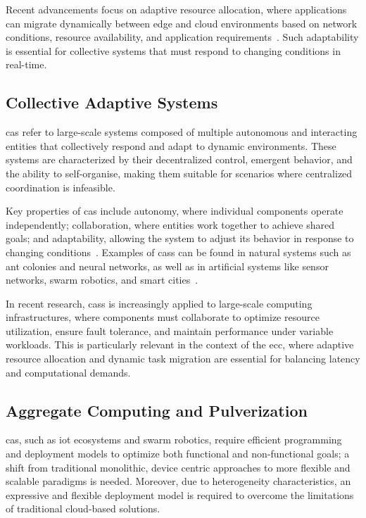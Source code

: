 \documentclass[runningheads]{llncs}
\begin{document}
Recent advancements focus on adaptive resource allocation,
where applications can migrate dynamically between edge and cloud environments based on network conditions,
resource availability,
and application requirements~\cite{DBLP:journals/fgcs/RomanLM18}.
%
Such adaptability is essential for collective systems that must respond to changing conditions in real-time.

\subsection{Collective Adaptive Systems}
\label{sec:cas}

\Ac{cas} refer to large-scale systems composed of multiple autonomous and interacting entities that collectively respond and adapt to dynamic environments.
%
These systems are characterized by their decentralized control,
emergent behavior,
and the ability to self-organise,
making them suitable for scenarios where centralized coordination is infeasible.

Key properties of \ac{cas} include autonomy,
where individual components operate independently;
collaboration,
where entities work together to achieve shared goals;
and adaptability,
allowing the system to adjust its behavior in response to changing conditions~\cite{DBLP:conf/birthday/BucchiaroneM19}.
%
Examples of \acp{cas} can be found in natural systems such as ant colonies and neural networks,
as well as in artificial systems like sensor networks,
swarm robotics,
and smart cities~\cite{DBLP:books/daglib/0023784}.

In recent research,
\acp{cas} is increasingly applied to large-scale computing infrastructures,
where components must collaborate to optimize resource utilization,
ensure fault tolerance,
and maintain performance under variable workloads.
%
This is particularly relevant in the context of the \ac{ecc},
where adaptive resource allocation and dynamic task migration are essential for balancing latency and computational demands.

\subsection{Aggregate Computing and Pulverization}
\label{sec:aggregate-computing}

\Ac{cas},
such as \ac{iot} ecosystems and swarm robotics,
require efficient programming and deployment models to optimize both functional and non-functional goals;
a shift from traditional monolithic,
device centric approaches to more flexible and scalable paradigms is needed.
%
Moreover,
due to heterogeneity characteristics,
an expressive and flexible deployment model is required to overcome the limitations of traditional cloud-based solutions.
\end{document}
